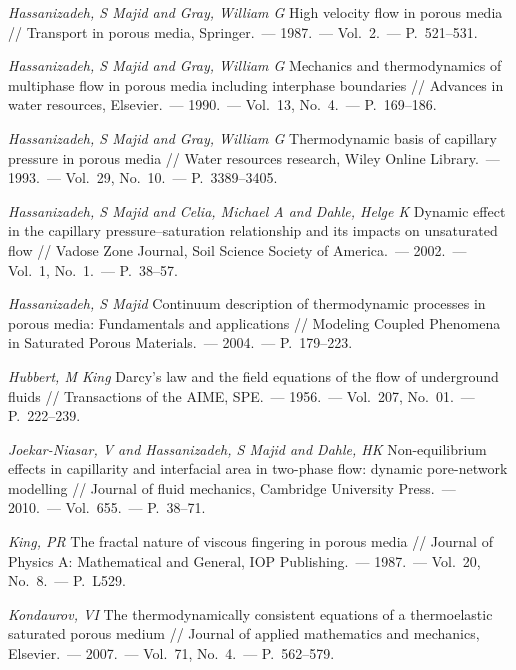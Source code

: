 \documentclass{crm-article}
\begin{document}
\begin{thebibliography}{100}
		 \textit{Hassanizadeh, S Majid and Gray, William G} High velocity flow in porous media // Transport in porous media, Springer.~--- 1987.~---  Vol.~2.~--- P.~521--531.

		 \textit{Hassanizadeh, S Majid and Gray, William G} Mechanics and thermodynamics of multiphase flow in porous media including interphase boundaries // Advances in water resources, Elsevier.~--- 1990.~---  Vol.~13, No.~4.~--- P.~169--186.

		 \textit{Hassanizadeh, S Majid and Gray, William G} Thermodynamic basis of capillary pressure in porous media // Water resources research, Wiley Online Library.~--- 1993.~---  Vol.~29, No.~10.~--- P.~3389--3405.

		 \textit{Hassanizadeh, S Majid and Celia, Michael A and Dahle, Helge K} Dynamic effect in the capillary pressure--saturation relationship and its impacts on unsaturated flow // Vadose Zone Journal, Soil Science Society of America.~--- 2002.~---  Vol.~1, No.~1.~--- P.~38--57.

		 \textit{Hassanizadeh, S Majid} Continuum description of thermodynamic processes in porous media: Fundamentals and applications // Modeling Coupled Phenomena in Saturated Porous Materials.~--- 2004.~--- P.~179--223.

		 \textit{Hubbert, M King} Darcy's law and the field equations of the flow of underground fluids // Transactions of the AIME, SPE.~--- 1956.~---  Vol.~207, No.~01.~--- P.~222--239.

		 \textit{Joekar-Niasar, V and Hassanizadeh, S Majid and Dahle, HK} Non-equilibrium effects in capillarity and interfacial area in two-phase flow: dynamic pore-network modelling // Journal of fluid mechanics, Cambridge University Press.~--- 2010.~---  Vol.~655.~--- P.~38--71.

		 \textit{King, PR} The fractal nature of viscous fingering in porous media // Journal of Physics A: Mathematical and General, IOP Publishing.~--- 1987.~---  Vol.~20, No.~8.~--- P.~L529.

		 \textit{Kondaurov, VI} The thermodynamically consistent equations of a thermoelastic saturated porous medium // Journal of applied mathematics and mechanics, Elsevier.~--- 2007.~---  Vol.~71, No.~4.~--- P.~562--579.


\end{thebibliography}
\end{document}
